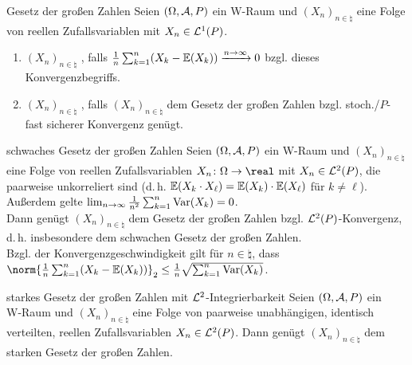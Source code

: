 \linie

\begin{Def}{Gesetz der großen Zahlen}
    Seien $(\Omega, \mathcal{A}, P)$ ein W-Raum und $(X_n)_{n \in \natural}$ eine Folge von reellen
    Zufallsvariablen mit $X_n \in \mathcal{L}^1(P)$.
    \begin{enumerate}
        \item
        $(X_n)_{n \in \natural}$ , falls
        $\frac{1}{n} \sum_{k=1}^n (X_k - \mathbb{E}(X_k)) \xrightarrow{n \to \infty} 0$
        bzgl. dieses Konvergenzbegriffs.
        
        \item
        $(X_n)_{n \in \natural}$ ,
        falls $(X_n)_{n \in \natural}$ dem Gesetz der großen Zahlen bzgl.
        stoch./$P$-fast sicherer Konvergenz genügt.
    \end{enumerate}
\end{Def}

\begin{Satz}{schwaches Gesetz der großen Zahlen}
    Seien $(\Omega, \mathcal{A}, P)$ ein W-Raum und $(X_n)_{n \in \natural}$ eine Folge von
    reellen Zufallsvariablen $X_n\colon \Omega \rightarrow \real$ mit $X_n \in \mathcal{L}^2(P)$,
    die paarweise unkorreliert sind (d.\,h. $\mathbb{E}(X_k \cdot X_\ell) = \mathbb{E}(X_k) \cdot \mathbb{E}(X_\ell)$
    für $k \not= \ell$).
    Außerdem gelte $\lim_{n \to \infty} \frac{1}{n^2} \sum_{k=1}^n \text{Var}(X_k) = 0$.\\
    Dann genügt $(X_n)_{n \in \natural}$ dem Gesetz der großen Zahlen bzgl. $\mathcal{L}^2(P)$-Konvergenz,
    d.\,h. insbesondere dem schwachen Gesetz der großen Zahlen.\\
    Bzgl. der Konvergenzgeschwindigkeit gilt für $n \in \natural$, dass\\
    $\norm{\frac{1}{n} \sum_{k=1}^n (X_k - \EW(X_k))}_2 \le
    \frac{1}{n} \sqrt{\sum_{k=1}^n \Var(X_k)}$.
\end{Satz}

\linie

\begin{Satz}{starkes Gesetz der großen Zahlen mit $\mathcal{L}^2$-Integrierbarkeit}
    Seien $(\Omega, \mathcal{A}, P)$ ein\\
    W-Raum und $(X_n)_{n \in \natural}$
    eine Folge von paarweise unabhängigen, identisch verteilten, reellen Zufallsvariablen
    $X_n \in \mathcal{L}^2(P)$.
    Dann genügt $(X_n)_{n \in \natural}$ dem starken Gesetz der großen Zahlen.
\end{Satz}

